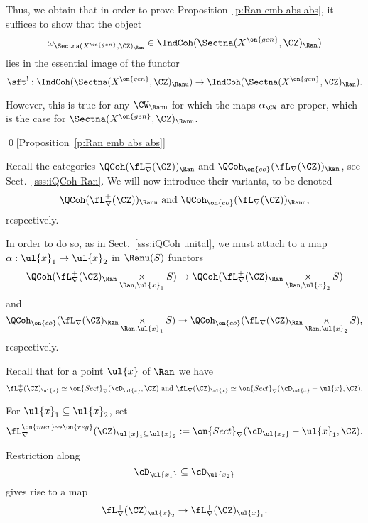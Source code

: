 \documentclass[9pt]{amsart}
\theoremstyle{remark}
\theoremstyle{definition}
\theoremstyle{remark}
\newcommand{\secref}[1]{Sect.~\ref{#1}}
\newcommand{\propref}[1]{Proposition~\ref{#1}}
\numberwithin{equation}{section}
\begin{document}
\sssec{}

Thus, we obtain that in order to prove \propref{p:Ran emb abs abs}, it suffices to show that the object
$$\omega_{\Sectna(X^{\on{gen}},\CZ)_\Ran}\in \IndCoh(\Sectna(X^{\on{gen}},\CZ)_\Ran)$$
lies in the essential image of the functor
$$\sft^!:\IndCoh(\Sectna(X^{\on{gen}},\CZ)_\Ranu)\to \IndCoh(\Sectna(X^{\on{gen}},\CZ)_\Ran).$$

\medskip

However, this is true for any $\CW_\Ranu$ for which the maps $\alpha_\CW$ are proper,
which is the case for $\Sectna(X^{\on{gen}},\CZ)_\Ranu$. 

\qed[\propref{p:Ran emb abs abs}]


\sssec{}

Recall the categories $\QCoh(\fL^+_\nabla(\CZ))_\Ran$ and $\QCoh_{\on{co}}(\fL_\nabla(\CZ))_\Ran$, see \secref{sss:iQCoh Ran}. We will now introduce their 
variants, to be denoted 
$$\QCoh(\fL^+_\nabla(\CZ))_\Ranu \text{ and } \QCoh_{\on{co}}(\fL_\nabla(\CZ))_\Ranu,$$
respectively. 

\medskip

In order to do so, as in \secref{sss:iQCoh unital}, we must attach to a map
$\alpha:\ul{x}_1\to \ul{x}_2$ in $\Ranu(S)$ functors
\begin{equation} \label{e:local arr}
\QCoh(\fL^+_\nabla(\CZ)_\Ran\underset{\Ran,\ul{x}_1}\times S)\to 
\QCoh(\fL^+_\nabla(\CZ)_\Ran\underset{\Ran,\ul{x}_2}\times S)
\end{equation} 
and 
\begin{equation} \label{e:local arr punct}
\QCoh_{\on{co}}(\fL_\nabla(\CZ)_\Ran\underset{\Ran,\ul{x}_1}\times S)
\to \QCoh_{\on{co}}(\fL_\nabla(\CZ)_\Ran\underset{\Ran,\ul{x}_2}\times S),
\end{equation} 
respectively.

\sssec{} \label{sss:add unit}

Recall that for a point $\ul{x}$ of $\Ran$ we have
$$\fL^+_\nabla(\CZ)_{\ul{x}}\simeq \on{Sect}_\nabla(\cD_{\ul{x}},\CZ) \text{ and } \fL_\nabla(\CZ)_{\ul{x}}\simeq \on{Sect}_\nabla(\cD_{\ul{x}}-\ul{x},\CZ).$$

For $\ul{x}_1\subseteq \ul{x}_2$, set
$$\fL_\nabla^{\on{mer}\rightsquigarrow \on{reg}}(\CZ)_{\ul{x}_1\subseteq \ul{x}_2}:=\on{Sect}_\nabla(\cD_{\ul{x_2}}-\ul{x}_1,\CZ).$$

Restriction along
$$\cD_{\ul{x_1}}\subseteq \cD_{\ul{x_2}}$$ gives rise to a map
\begin{equation} \label{e:loc sect map}
\fL^+_\nabla(\CZ)_{\ul{x}_2}\to \fL^+_\nabla(\CZ)_{\ul{x}_1}.
\end{equation} 
\end{document}
